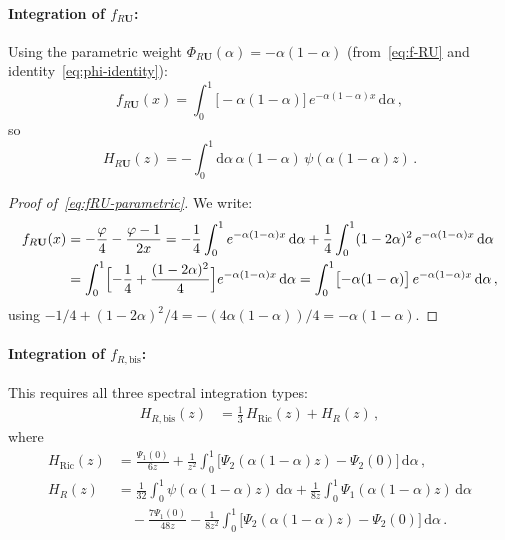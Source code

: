 \documentclass[11pt,a4paper]{article}
\newcommand{\dd}{\mathrm{d}}
\theoremstyle{definition}
\theoremstyle{remark}
\begin{document}
\paragraph{Integration of $f_{R\mathbf{U}}$:}
Using the parametric weight $\Phi_{R\mathbf{U}}(\alpha) = -\alpha(1-\alpha)$
(from~\eqref{eq:f-RU} and identity~\eqref{eq:phi-identity}):
\begin{equation}
  f_{R\mathbf{U}}(x) = \int_0^1
  \bigl[-\alpha(1-\alpha)\bigr]\,e^{-\alpha(1-\alpha)x}\,\dd\alpha\,,
  \label{eq:fRU-parametric}
\end{equation}
so
\begin{equation}
  H_{R\mathbf{U}}(z)
  = -\int_0^1 \dd\alpha\,\alpha(1-\alpha)\,\psi(\alpha(1-\alpha)z)\,.
  \label{eq:H-RU}
\end{equation}
\begin{proof}[Proof of~\eqref{eq:fRU-parametric}]
We write:
\begin{align*}
  f_{R\mathbf{U}}(x)
  &= -\frac{\varphi}{4} - \frac{\varphi-1}{2x}
  = -\frac{1}{4}\int_0^1 e^{-\alpha(1-\alpha)x}\,\dd\alpha
  + \frac{1}{4}\int_0^1 (1-2\alpha)^2\,e^{-\alpha(1-\alpha)x}\,\dd\alpha\\
  &= \int_0^1 \Bigl[-\frac{1}{4} + \frac{(1-2\alpha)^2}{4}\Bigr]
  e^{-\alpha(1-\alpha)x}\,\dd\alpha
  = \int_0^1 \bigl[-\alpha(1-\alpha)\bigr]\,e^{-\alpha(1-\alpha)x}\,\dd\alpha\,,
\end{align*}
using $-1/4 + (1-2\alpha)^2/4 = -(4\alpha(1-\alpha))/4 = -\alpha(1-\alpha)$.
\end{proof}

\paragraph{Integration of $f_{R,\text{bis}}$:}
This requires all three spectral integration types:
\begin{align}
  H_{R,\text{bis}}(z) &= \frac{1}{3}\,H_{\text{Ric}}(z) + H_R(z)\,,
  \label{eq:H-Rbis}
\end{align}
where
\begin{align}
  H_{\text{Ric}}(z) &= \frac{\Psi_1(0)}{6z}
  + \frac{1}{z^2}\int_0^1\bigl[\Psi_2(\alpha(1-\alpha)z)
  - \Psi_2(0)\bigr]\,\dd\alpha\,,
  \label{eq:H-Ric}\\[4pt]
  H_R(z) &= \frac{1}{32}\int_0^1\psi(\alpha(1-\alpha)z)\,\dd\alpha
  + \frac{1}{8z}\int_0^1\Psi_1(\alpha(1-\alpha)z)\,\dd\alpha
  \nonumber\\
  &\quad - \frac{7\Psi_1(0)}{48z}
  - \frac{1}{8z^2}\int_0^1\bigl[\Psi_2(\alpha(1-\alpha)z)
  - \Psi_2(0)\bigr]\,\dd\alpha\,.
  \label{eq:H-fR}
\end{align}
\end{document}
